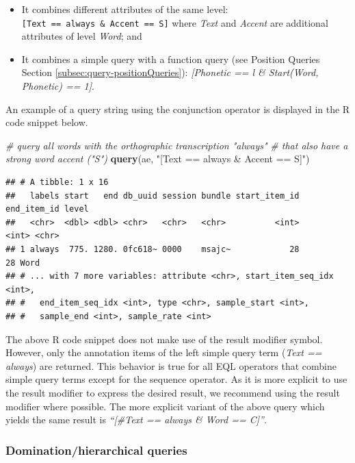 \documentclass[]{book}
\newenvironment{Shaded}{\begin{snugshade}}{\end{snugshade}}
\newcommand{\CommentTok}[1]{\textcolor[rgb]{0.56,0.35,0.01}{\textit{#1}}}
\newcommand{\KeywordTok}[1]{\textcolor[rgb]{0.13,0.29,0.53}{\textbf{#1}}}
\newcommand{\NormalTok}[1]{#1}
\newcommand{\StringTok}[1]{\textcolor[rgb]{0.31,0.60,0.02}{#1}}
\providecommand{\tightlist}{%
  \setlength{\itemsep}{0pt}\setlength{\parskip}{0pt}}
\begin{document}
\begin{itemize}
\tightlist
\item
  It combines different attributes of the same level: \texttt{{[}Text\ ==\ always\ \&\ Accent\ ==\ S{]}} where \emph{Text} and \emph{Accent} are additional attributes of level \emph{Word}; and
\item
  It combines a simple query with a function query (see Position Queries Section \ref{subsec:query-positionQueries}): \emph{{[}Phonetic == l \& Start(Word, Phonetic) == 1{]}}.
\end{itemize}

An example of a query string using the conjunction operator is displayed in the R code snippet below.

\begin{Shaded}
\begin{Highlighting}[]
\CommentTok{# query all words with the orthographic transcription "always"}
\CommentTok{# that also have a strong word accent ("S")}
\KeywordTok{query}\NormalTok{(ae, }\StringTok{"[Text == always & Accent == S]"}\NormalTok{)}
\end{Highlighting}
\end{Shaded}

\begin{verbatim}
## # A tibble: 1 x 16
##   labels start   end db_uuid session bundle start_item_id end_item_id level
##   <chr>  <dbl> <dbl> <chr>   <chr>   <chr>          <int>       <int> <chr>
## 1 always  775. 1280. 0fc618~ 0000    msajc~            28          28 Word 
## # ... with 7 more variables: attribute <chr>, start_item_seq_idx <int>,
## #   end_item_seq_idx <int>, type <chr>, sample_start <int>,
## #   sample_end <int>, sample_rate <int>
\end{verbatim}

The above R code snippet does not make use of the result modifier symbol. However, only the annotation items of the left simple query term (\emph{Text == always}) are returned. This behavior is true for all EQL operators that combine simple query terms except for the sequence operator. As it is more explicit to use the result modifier to express the desired result, we recommend using the result modifier where possible. The more explicit variant of the above query which yields the same result is \emph{``{[}\#Text == always \& Word == C{]}''}.

\hypertarget{subsubsec:query_dominationQueries}{%
\subsubsection{Domination/hierarchical queries}\label{subsubsec:query_dominationQueries}}
\end{document}
